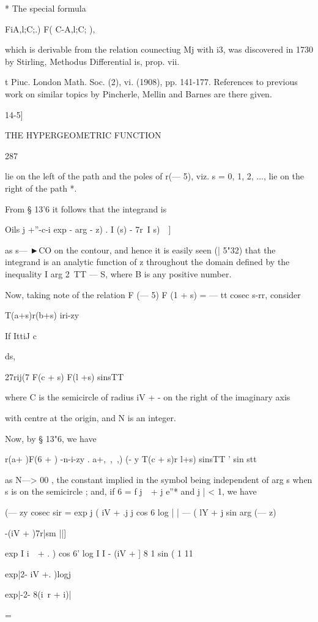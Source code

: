* The special formula

FiA,l;C;.) F( C-A,l;C; ),

which is derivable from the relation counectiug Mj with i3, was
discovered in 1730 by Stirling, Methodus Differential is, prop. vii.

t Piuc. London Math. Soc. (2), vi. (1908), pp. 141-177. References to
previous work on similar topics by Pincherle, Mellin and Barnes are
there given.

14-5]

THE HYPERGEOMETRIC FUNCTION

287

lie on the left of the path and the poles of r(— 5), viz. s = 0, 1, 2,
..., lie on the right of the path *.

From § 13'6 it follows that the integrand is

Oils j +''-c-i exp - arg - z) . I (s) - 7r\ I s)\ \ ]

as s— ►CO on the contour, and hence it is easily seen (| 5"32) that
the integrand is an analytic function of z throughout the domain
defined by the inequality I arg 2\ TT — S, where B is any positive
number.

Now, taking note of the relation F (— 5) F (1 + s) = — tt cosec s-rr,
consider

T(a+s)r(b+s) iri-zy

If IttiJ c

ds,

27rij(7 F(c + s) F(l +s) sinsTT

where C is the semicircle of radius iV + - on the right of the
imaginary axis

with centre at the origin, and N is an integer.

Now, by § 13"6, we have

r(a+ )F(6 + ) -n-i-zy . a+,\ ,\ ,) (- y T(c + s)r l+s) sinsTT ' sin
stt

as N—> 00 , the constant implied in the symbol being independent of
arg s when s is on the semicircle ; and, if 6 = f j\ \ + j e''* and j
| < 1, we have

(— zy cosec sir = exp j ( iV + .j j cos 6 log | | — ( lY + j sin arg
(— z)

-(iV + )7r|sm ||]

exp I i\ \ + . ) cos 6' log I I - (iV + ] 8 1 sin ( 1 11

exp|2- iV +. )logj

exp|-2- 8(i\ r + i)|

=

